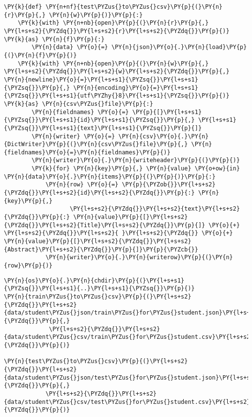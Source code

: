 \documentclass[../main.tex]{subfiles}
\begin{document}
\begin{tcolorbox}[breakable, size=fbox, boxrule=1pt, pad at break*=1mm,colback=cellbackground, colframe=cellborder]
\begin{Verbatim}[commandchars=\\\{\}]
\PY{k}{def} \PY{n+nf}{test\PYZus{}to\PYZus{}csv}\PY{p}{(}\PY{n}{r}\PY{p}{,} \PY{n}{w}\PY{p}{)}\PY{p}{:}
    \PY{k}{with} \PY{n+nb}{open}\PY{p}{(}\PY{n}{r}\PY{p}{,} \PY{l+s+s2}{\PYZdq{}}\PY{l+s+s2}{r}\PY{l+s+s2}{\PYZdq{}}\PY{p}{)} \PY{k}{as} \PY{n}{f}\PY{p}{:}
        \PY{n}{data} \PY{o}{=} \PY{n}{json}\PY{o}{.}\PY{n}{load}\PY{p}{(}\PY{n}{f}\PY{p}{)}
    \PY{k}{with} \PY{n+nb}{open}\PY{p}{(}\PY{n}{w}\PY{p}{,} \PY{l+s+s2}{\PYZdq{}}\PY{l+s+s2}{w}\PY{l+s+s2}{\PYZdq{}}\PY{p}{,} \PY{n}{newline}\PY{o}{=}\PY{l+s+s1}{\PYZsq{}}\PY{l+s+s1}{\PYZsq{}}\PY{p}{,} \PY{n}{encoding}\PY{o}{=}\PY{l+s+s1}{\PYZsq{}}\PY{l+s+s1}{utf\PYZhy{}8}\PY{l+s+s1}{\PYZsq{}}\PY{p}{)} \PY{k}{as} \PY{n}{csv\PYZus{}file}\PY{p}{:}
        \PY{n}{fieldnames} \PY{o}{=} \PY{p}{[}\PY{l+s+s1}{\PYZsq{}}\PY{l+s+s1}{id}\PY{l+s+s1}{\PYZsq{}}\PY{p}{,} \PY{l+s+s1}{\PYZsq{}}\PY{l+s+s1}{text}\PY{l+s+s1}{\PYZsq{}}\PY{p}{]}
        \PY{n}{writer} \PY{o}{=} \PY{n}{csv}\PY{o}{.}\PY{n}{DictWriter}\PY{p}{(}\PY{n}{csv\PYZus{}file}\PY{p}{,} \PY{n}{fieldnames}\PY{o}{=}\PY{n}{fieldnames}\PY{p}{)}
        \PY{n}{writer}\PY{o}{.}\PY{n}{writeheader}\PY{p}{(}\PY{p}{)}
        \PY{k}{for} \PY{n}{key}\PY{p}{,} \PY{n}{value} \PY{o+ow}{in} \PY{n}{data}\PY{o}{.}\PY{n}{items}\PY{p}{(}\PY{p}{)}\PY{p}{:}
            \PY{n}{row} \PY{o}{=} \PY{p}{\PYZob{}}\PY{l+s+s2}{\PYZdq{}}\PY{l+s+s2}{id}\PY{l+s+s2}{\PYZdq{}}\PY{p}{:} \PY{n}{key}\PY{p}{,}
                   \PY{l+s+s2}{\PYZdq{}}\PY{l+s+s2}{text}\PY{l+s+s2}{\PYZdq{}}\PY{p}{:} \PY{n}{value}\PY{p}{[}\PY{l+s+s2}{\PYZdq{}}\PY{l+s+s2}{Title}\PY{l+s+s2}{\PYZdq{}}\PY{p}{]} \PY{o}{+} \PY{l+s+s2}{\PYZdq{}}\PY{l+s+s2}{ }\PY{l+s+s2}{\PYZdq{}} \PY{o}{+} \PY{n}{value}\PY{p}{[}\PY{l+s+s2}{\PYZdq{}}\PY{l+s+s2}{Abstract}\PY{l+s+s2}{\PYZdq{}}\PY{p}{]}\PY{p}{\PYZcb{}}
            \PY{n}{writer}\PY{o}{.}\PY{n}{writerow}\PY{p}{(}\PY{n}{row}\PY{p}{)}
\end{Verbatim}
\end{tcolorbox}

    \begin{tcolorbox}[breakable, size=fbox, boxrule=1pt, pad at break*=1mm,colback=cellbackground, colframe=cellborder]
\begin{Verbatim}[commandchars=\\\{\}]
\PY{n}{os}\PY{o}{.}\PY{n}{chdir}\PY{p}{(}\PY{l+s+s1}{\PYZsq{}}\PY{l+s+s1}{..}\PY{l+s+s1}{\PYZsq{}}\PY{p}{)}
\PY{n}{train\PYZus{}to\PYZus{}csv}\PY{p}{(}\PY{l+s+s2}{\PYZdq{}}\PY{l+s+s2}{data/student\PYZus{}json/train\PYZus{}for\PYZus{}student.json}\PY{l+s+s2}{\PYZdq{}}\PY{p}{,}
             \PY{l+s+s2}{\PYZdq{}}\PY{l+s+s2}{data/student\PYZus{}csv/train\PYZus{}for\PYZus{}student.csv}\PY{l+s+s2}{\PYZdq{}}\PY{p}{)}

\PY{n}{test\PYZus{}to\PYZus{}csv}\PY{p}{(}\PY{l+s+s2}{\PYZdq{}}\PY{l+s+s2}{data/student\PYZus{}json/test\PYZus{}for\PYZus{}student.json}\PY{l+s+s2}{\PYZdq{}}\PY{p}{,}
            \PY{l+s+s2}{\PYZdq{}}\PY{l+s+s2}{data/student\PYZus{}csv/test\PYZus{}for\PYZus{}student.csv}\PY{l+s+s2}{\PYZdq{}}\PY{p}{)}
\end{Verbatim}
\end{tcolorbox}
\end{document}
